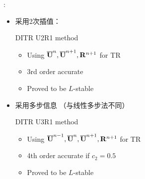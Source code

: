 \documentclass[aspectratio=169,serif]{beamer} %
\begin{document}
\begin{frame}{\secname: \subsecname}
  \begin{itemize}
    \small
    \item 采用2次插值：
          \begin{block}{DITR U2R1 method}
            \begin{itemize}
              \item Using $\overline{\mathbf{U}}^{n},\overline{\mathbf{U}}^{n+1},\mathbf{R}^{n+1}$ for TR
              \item 3rd order accurate
              \item Proved to be $L$-stable
            \end{itemize}
          \end{block}
    \item 采用多步信息 （与线性多步法不同）
          \begin{block}{DITR U3R1 method}
            \begin{itemize}
              \item Using $\overline{\mathbf{U}}^{n-1},\overline{\mathbf{U}}^{n},\overline{\mathbf{U}}^{n+1},\mathbf{R}^{n+1}$ for TR
              \item 4th order accurate if $c_2=0.5$
              \item Proved to be $L$-stable
            \end{itemize}
          \end{block}
  \end{itemize}
\end{frame}
\end{document}
